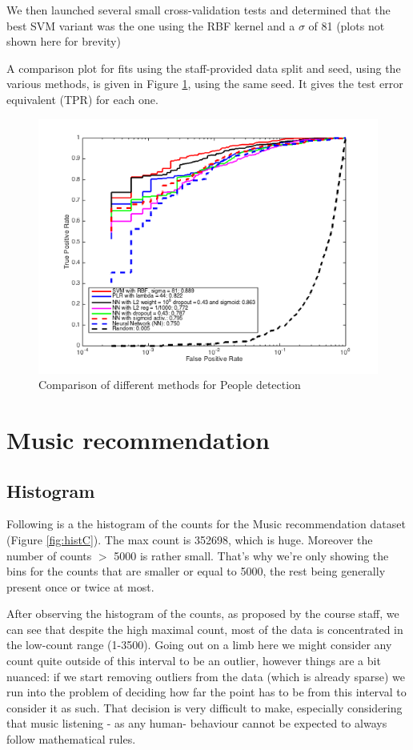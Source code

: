 \documentclass{article} %
\begin{document}
We then launched several small cross-validation tests and determined that the best SVM variant was the one using the RBF kernel and a $\sigma$ of 81 (plots not shown here for brevity)

A comparison plot for fits using the staff-provided data split and seed, using the various methods, is given in Figure \ref{fig:pdplot}, using the same seed. It gives the test error equivalent (TPR) for each one.
\begin{figure}
\centering
\includegraphics[width=1\textwidth]{images/PDTPRcomparisonplots.png}
\caption{Comparison of different methods for People detection}
\label{fig:pdplot}
\end{figure}
\section{Music recommendation}
\subsection{Histogram}
Following is a the histogram of the counts for the Music recommendation dataset (Figure \ref{fig:histC}). The max count is 352698, which is huge. Moreover the number of counts $>$ 5000 is rather small. That’s why we’re only showing the bins for the counts that are smaller or equal to 5000, the rest being generally present once or twice at most.

After observing the histogram of the counts, as proposed by the course staff, we can see that despite the high maximal count, most of the data is concentrated in the low-count range (1-3500). Going out on a limb here we might consider any count quite outside of this interval to be an outlier, however things are a bit nuanced: if we start removing outliers from the data (which is already sparse) we run into the problem of deciding how far the point has to be from this interval to consider it as such. That decision is very difficult to make, especially considering that music listening - as any human-  behaviour cannot be expected to always follow mathematical rules.
\end{document}
